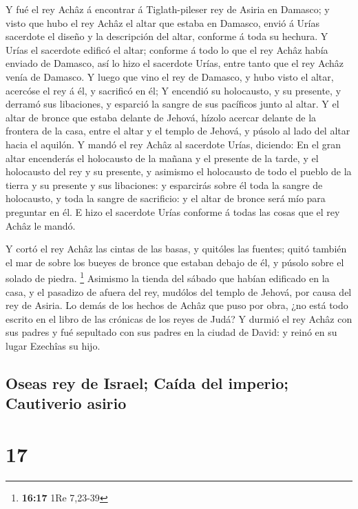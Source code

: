  Y fué el rey Achâz á encontrar á Tiglath-pileser rey de
Asiria en Damasco; y visto que hubo el rey Achâz el altar que estaba en
Damasco, envió á Urías sacerdote el diseño y la descripción del altar,
conforme á toda su hechura.  Y Urías el sacerdote edificó
el altar; conforme á todo lo que el rey Achâz había enviado de Damasco,
así lo hizo el sacerdote Urías, entre tanto que el rey Achâz venía de
Damasco.  Y luego que vino el rey de Damasco, y hubo visto
el altar, acercóse el rey á él, y sacrificó en él;  Y
encendió su holocausto, y su presente, y derramó sus libaciones, y
esparció la sangre de sus pacíficos junto al altar.  Y el
altar de bronce que estaba delante de Jehová, hízolo acercar delante de
la frontera de la casa, entre el altar y el templo de Jehová, y púsolo
al lado del altar hacia el aquilón.  Y mandó el rey Achâz
al sacerdote Urías, diciendo: En el gran altar encenderás el holocausto
de la mañana y el presente de la tarde, y el holocausto del rey y su
presente, y asimismo el holocausto de todo el pueblo de la tierra y su
presente y sus libaciones: y esparcirás sobre él toda la sangre de
holocausto, y toda la sangre de sacrificio: y el altar de bronce será
mío para preguntar en él.  E hizo el sacerdote Urías
conforme á todas las cosas que el rey Achâz le mandó.

 Y cortó el rey Achâz las cintas de las basas, y quitóles
las fuentes; quitó también el mar de sobre los bueyes de bronce que
estaban debajo de él, y púsolo sobre el solado de piedra. \footnote{\textbf{16:17}
  1Re 7,23-39}  Asimismo la tienda del sábado que habían
edificado en la casa, y el pasadizo de afuera del rey, mudólos del
templo de Jehová, por causa del rey de Asiria.  Lo demás de
los hechos de Achâz que puso por obra, ¿no está todo escrito en el libro
de las crónicas de los reyes de Judá?  Y durmió el rey
Achâz con sus padres y fué sepultado con sus padres en la ciudad de
David: y reinó en su lugar Ezechîas su hijo.

\hypertarget{oseas-rey-de-israel-cauxedda-del-imperio-cautiverio-asirio}{%
\subsection{Oseas rey de Israel; Caída del imperio; Cautiverio
asirio}\label{oseas-rey-de-israel-cauxedda-del-imperio-cautiverio-asirio}}

\hypertarget{section-16}{%
\section{17}\label{section-16}}

